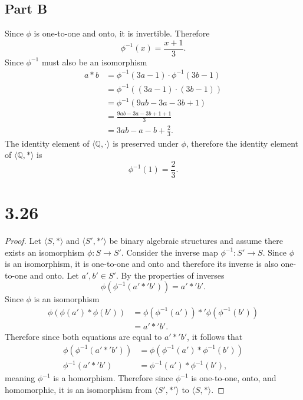 \documentclass[12pt]{extarticle}
\begin{document}
\subsection*{Part B}
Since $\phi$ is one-to-one and onto, it is invertible. Therefore
\[
	\phi^{-1}(x) = \frac{x+1}{3}
.\]
Since $\phi^{-1}$ must also be an isomorphism
\begin{align*}
	a * b &= \phi^{-1}(3a - 1) \cdot \phi^{-1}(3b - 1) \\
				&= \phi^{-1} ((3a - 1) \cdot (3b -1)) \\
				&= \phi^{-1} (9ab - 3a - 3b + 1) \\
				&= \frac{9ab - 3a - 3b + 1 + 1}{3} \\
				&= 3ab - a - b + \frac{2}{3}
.\end{align*}
The identity element of $\langle \mathbb{Q}, \cdot \rangle$ is preserved under $\phi$, therefore the identity element of $\langle \mathbb{Q}, * \rangle$ is
\[
	\phi^{-1}(1) = \frac{2}{3}
.\]

\section*{3.26}
\begin{proof}
	Let $\langle S, * \rangle$ and $\langle S', *' \rangle$ be binary algebraic structures and assume there exists an isomorphism $\phi : S \to S'$. Consider the inverse map $\phi^{-1} : S' \to S$. Since $\phi$ is an isomorphism, it is one-to-one and onto and therefore its inverse is also one-to-one and onto. Let $a',b' \in S'$. By the properties of inverses
	\[
		\phi(\phi^{-1} (a' *' b')) = a' *' b'
	.\]
	Since $\phi$ is an isomorphism
	\begin{align*}
		\phi(\phi(a') * \phi(b')) &= \phi(\phi^{-1} (a')) *' \phi(\phi^{-1}(b')) \\
		&= a' *' b'
	.\end{align*}
	Therefore since both equations are equal to $a' *' b'$, it follows that
	\begin{align*}
		\phi(\phi^{-1}(a' *' b')) &= \phi(\phi^{-1}(a') * \phi^{-1}(b')) \\
		\phi^{-1}(a' *' b') &= \phi^{-1}(a') * \phi^{-1}(b')
	,\end{align*}
	meaning $\phi^{-1}$ is a homorphism. Therefore since $\phi^{-1}$ is one-to-one, onto, and homomorphic, it is an isomorphism from $\langle S', *' \rangle$ to $\langle S, * \rangle$.
\end{proof}
\end{document}
